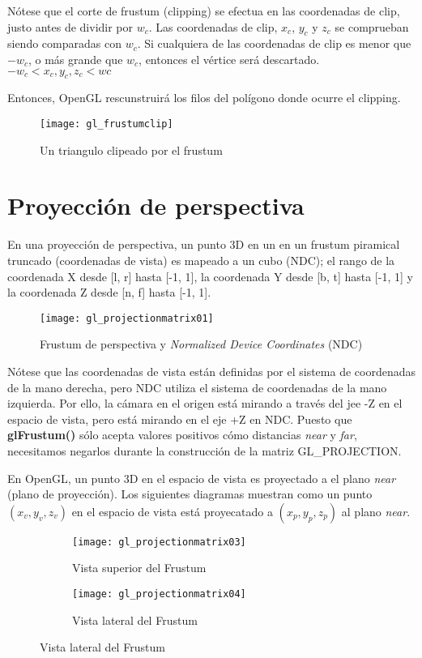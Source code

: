 Nótese que el corte de frustum (clipping) se efectua en las coordenadas de clip, justo antes de dividir por $w_c$. Las coordenadas de clip, $x_c$, $y_c$ y $z_c$ se comprueban siendo comparadas con $w_c$. Si cualquiera de las coordenadas de clip es menor que $-w_c$, o más grande que $w_c$, entonces el vértice será descartado.
$ -w_c < x_c, y_c, z_c < wc $

Entonces, OpenGL rescunstruirá los filos del polígono donde ocurre el clipping.

\begin{figure} [h]
  \centering
  \texttt{[image: gl\_frustumclip]}
  \caption{Un triangulo clipeado por el frustum}
\end{figure}

\section{Proyección de perspectiva}
En una proyección de perspectiva, un punto 3D en un en un frustum piramical truncado (coordenadas de vista) es mapeado a un cubo (NDC); el rango de la coordenada X desde [l, r] hasta [-1, 1], la coordenada Y desde [b, t] hasta [-1, 1] y la coordenada Z desde [n, f] hasta [-1, 1].

\begin{figure} [h]
  \centering
  \texttt{[image: gl\_projectionmatrix01]}
  \caption{Frustum de perspectiva y \textit{Normalized Device Coordinates} (NDC)}
\end{figure}


\newpage

Nótese que las coordenadas de vista están definidas por el sistema de coordenadas de la mano derecha, pero NDC utiliza el sistema de coordenadas de la mano izquierda. Por ello, la cámara en el origen está mirando a través del jee -Z en el espacio de vista, pero está mirando en el eje +Z en NDC. Puesto que \textbf{glFrustum()} sólo acepta valores positivos cómo distancias \textit{near} y \textit{far}, necesitamos negarlos durante la construcción de la matriz GL\_PROJECTION.

En OpenGL, un punto 3D en el espacio de vista es proyectado a el plano \textit{near} (plano de proyección). Los siguientes diagramas muestran como un punto $(x_v, y_v, z_v)$ en el espacio de vista está proyecatado a $(x_p, y_p, z_p)$ al plano \textit{near}.

\begin{figure} [h]
  \centering
  \captionsetup[subfigure]{justification=centering}
  \begin{subfigure}{0.3\textwidth} 
    \texttt{[image: gl\_projectionmatrix03]} 
    \caption{Vista superior del Frustum}
  \end{subfigure}
  \begin{subfigure}{0.3\textwidth}
    \texttt{[image: gl\_projectionmatrix04]} 
    \caption{Vista lateral del Frustum}
  \end{subfigure}
\end{figure}

